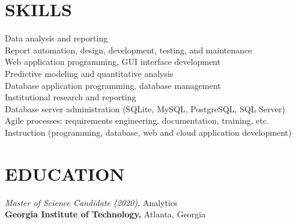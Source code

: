\documentclass[margin, 10pt]{res} %
\begin{document}
\begin{resume}

 
\section{SKILLS}  

Data analysis and reporting\\
Report automation, design, development, testing, and maintenance\\
Web application programming, GUI interface development\\
Predictive modeling and quantitative analysis\\
Database application programming, database management\\
Institutional research and reporting\\
Database server administration (SQLite, MySQL, PostgreSQL, SQL Server)\\
Agile processes: requirements engineering, documentation, training, etc.\\
Instruction (programming, database, web and cloud application development)\\


\section{EDUCATION}


    {\it Master of Science Candidate (2020),} Analytics\\
\textbf{Georgia Institute of Technology,} Atlanta, Georgia


\end{resume}
\end{document}
